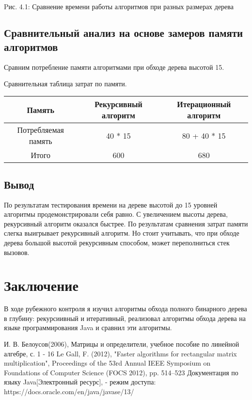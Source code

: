 \documentclass[12pt]{report}
\begin{document}
\begin{center}
Pис. 4.1: Сравнение времени работы алгоритмов при разных размерах дерева
\end{center}

\section{Сравнительный анализ на основе замеров памяти алгоритмов}
Сравним потребление памяти алгоритмами при обходе дерева высотой 15.

Сравнительная таблица затрат по памяти.
\begin{center}
	\begin{tabular}{|c c c|} 
 	\hline
	Память & Рекурсивный алгоритм & Итерационный алгоритм \\ [0.5ex] 
 	\hline\hline
 	Потребляемая память & 40 * 15 & 80 + 40 * 15 \\
	\hline
	Итого & 600 & 680 \\
	\hline
	\end{tabular}
\end{center}
\section{Вывод}
По результатам тестирования времени на дереве высотой до 15 уровней алгоритмы продемонстрировали себя равно. С увеличением высоты дерева, рекурсивный алгоритм оказался быстрее.
По результатам сравнения затрат памяти слегка выигрывает рекурсивный алгоритм. Но стоит учитывать, что при обходе дерева большой высотой рекурсивным способом, может переполниться стек вызовов.



\chapter*{Заключение}
В ходе рубежного контроля я изучил алгоритмы обхода полного бинарного дерева в глубину: рекурсиивный и итеративный, реализовал алгоритмы обхода дерева на языке программирования Java и сравнил эти алгоритмы.

 \begin{thebibliography}{3}
И. В. Белоусов(2006), Матрицы и определители, учебное пособие по линейной алгебре, с. 1 - 16
Le Gall, F. (2012), "Faster algorithms for rectangular matrix multiplication", Proceedings of the 53rd Annual IEEE Symposium on Foundations of Computer Science (FOCS 2012), pp. 514–523
Документация по языку Java[Электронный ресурс], - режим доступа: https://docs.oracle.com/en/java/javase/13/
\end{thebibliography}
\end{document}

